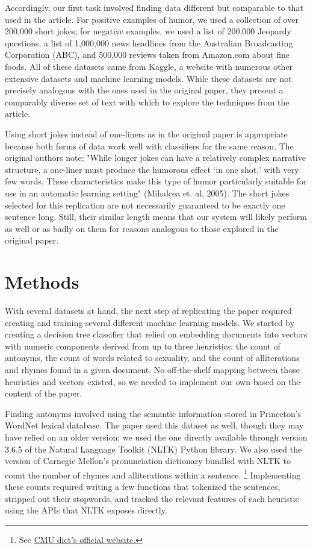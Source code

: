 \documentclass[11pt,a4paper]{article}
\begin{document}
Accordingly, our first task involved finding data different but comparable to that used in the article. For positive examples of humor, we used a collection of over 200,000 short jokes; for negative examples, we used a list of 200,000 Jeopardy questions, a list of 1,000,000 news headlines from the Australian Broadcasting Corporation (ABC), and 500,000 reviews taken from Amazon.com about fine foods. \cite{short-jokes} \cite{news-headlines} \cite{jeopardy-questions} \cite{amazon-reviews} All of these datasets came from Kaggle, a website with numerous other extensive datasets and machine learning models. While these datasets are not precisely analogous with the ones used in the original paper, they present a comparably diverse set of text with which to explore the techniques from the article.

Using short jokes instead of one-liners as in the original paper is appropriate because both forms of data work well with classifiers for the same reason. The original authors note: "While longer jokes can have a relatively complex narrative structure, a one-liner must produce the humorous effect `in one shot,' with very few words. These characteristics make this type of humor particularly suitable for use in an automatic learning setting" (Mihalcea et. al, 2005). The short jokes selected for this replication are not necessarily guaranteed to be exactly one sentence long. Still, their similar length means that our system will likely perform as well or as badly on them for reasons analogous to those explored in the original paper.

\section{Methods}
With several datasets at hand, the next step of replicating the paper required creating and training several different machine learning models. We started by creating a decision tree classifier that relied on embedding documents into vectors with numeric components derived from up to three heuristics: the count of antonyms, the count of words related to sexuality, and the count of alliterations and rhymes found in a given document. No off-the-shelf mapping between those heuristics and vectors existed, so we needed to implement our own based on the content of the paper.

Finding antonyms involved using the semantic information stored in Princeton's WordNet lexical database. \cite{10.1145/219717.219748} The paper used this dataset as well, though they may have relied on an older version; we used the one directly available through version 3.6.5 of the Natural Language Toolkit (NLTK) Python library. \cite{10.5555/1717171} We also used the version of Carnegie Mellon's pronunciation dictionary bundled with NLTK to count the number of rhymes and alliterations within a sentence. \footnote{See \href{http://www.speech.cs.cmu.edu/cgi-bin/cmudict}{CMU dict's official website.}} Implementing these counts required writing a few functions that tokenized the sentences, stripped out their stopwords, and tracked the relevant features of each heuristic using the APIs that NLTK exposes directly.
\end{document}
